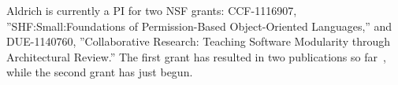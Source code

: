 \documentclass[10pt]{article}
\begin{document}
Aldrich is currently a PI for two NSF grants: CCF-1116907, ''SHF:Small:Foundations of Permission-Based Object-Oriented Languages,'' and DUE-1140760, ''Collaborative Research: Teaching Software Modularity through Architectural Review.''  The first grant has resulted in two publications so far~\cite{naden12:borrowing,hannesPlural}, while the second grant has just begun.

\newpage

%
%

\setcounter{page}{1}
\renewcommand{\thepage}{References - \arabic{page}}



%
%
\end{document}
